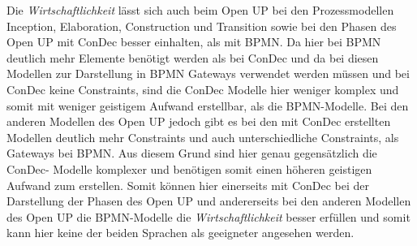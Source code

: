 Die \textit{Wirtschaftlichkeit} lässt sich auch beim Open UP bei den Prozessmodellen Inception, Elaboration, Construction und Transition sowie bei den Phasen des Open UP mit ConDec besser einhalten, als mit BPMN. Da hier bei BPMN deutlich mehr Elemente benötigt werden als bei ConDec und da bei diesen Modellen zur Darstellung in BPMN Gateways verwendet werden müssen und bei ConDec keine Constraints, sind die ConDec Modelle hier weniger komplex und somit mit weniger geistigem Aufwand erstellbar, als die BPMN-Modelle.  \newline
Bei den anderen Modellen des Open UP jedoch gibt es bei den mit ConDec erstellten Modellen deutlich mehr Constraints und auch unterschiedliche Constraints, als  Gateways bei BPMN. Aus diesem Grund sind hier genau gegensätzlich die ConDec- Modelle komplexer und benötigen somit einen höheren geistigen Aufwand zum erstellen. \newline
Somit können hier einerseits mit ConDec bei der Darstellung der Phasen des Open UP und andererseits bei den anderen Modellen des Open UP die BPMN-Modelle die \textit{Wirtschaftlichkeit} besser erfüllen und somit kann hier keine der beiden Sprachen als geeigneter angesehen werden.\newline


